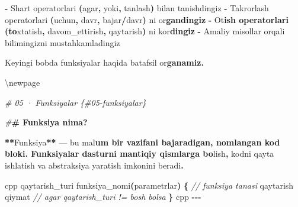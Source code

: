 \documentclass[a4paper,11pt,twoside,openright]{book}
\newenvironment{Shaded}{\begin{snugshade}}{\end{snugshade}}
\newcommand{\CharTok}[1]{\textcolor[rgb]{0.31,0.60,0.02}{#1}}
\newcommand{\CommentTok}[1]{\textcolor[rgb]{0.56,0.35,0.01}{\textit{#1}}}
\newcommand{\ErrorTok}[1]{\textcolor[rgb]{0.64,0.00,0.00}{\textbf{#1}}}
\newcommand{\NormalTok}[1]{#1}
\newcommand{\OperatorTok}[1]{\textcolor[rgb]{0.81,0.36,0.00}{\textbf{#1}}}
\newcommand{\PreprocessorTok}[1]{\textcolor[rgb]{0.56,0.35,0.01}{\textit{#1}}}
\begin{document}
\begin{Shaded}
\begin{Highlighting}[]
\OperatorTok{{-}}\NormalTok{ Shart operatorlari }\OperatorTok{(}\ErrorTok{\textasciigrave{}}\NormalTok{agar}\ErrorTok{\textasciigrave{}}\OperatorTok{,} \ErrorTok{\textasciigrave{}}\NormalTok{yoki}\ErrorTok{\textasciigrave{}}\OperatorTok{,} \ErrorTok{\textasciigrave{}}\NormalTok{tanlash}\ErrorTok{\textasciigrave{}}\OperatorTok{)}\NormalTok{ bilan tanishdingiz}
\OperatorTok{{-}}\NormalTok{ Takrorlash operatorlari }\OperatorTok{(}\ErrorTok{\textasciigrave{}}\NormalTok{uchun}\ErrorTok{\textasciigrave{}}\OperatorTok{,} \ErrorTok{\textasciigrave{}}\NormalTok{davr}\ErrorTok{\textasciigrave{}}\OperatorTok{,} \ErrorTok{\textasciigrave{}}\NormalTok{bajar}\OperatorTok{/}\NormalTok{davr}\ErrorTok{\textasciigrave{}}\OperatorTok{)}\NormalTok{ ni o}\CharTok{\textquotesingle{}r}\ErrorTok{gandingiz}
\OperatorTok{{-}}\NormalTok{ O}\CharTok{\textquotesingle{}t}\ErrorTok{ish operatorlari (\textasciigrave{}to}\CharTok{\textquotesingle{}}\NormalTok{xtatish}\ErrorTok{\textasciigrave{}}\OperatorTok{,} \ErrorTok{\textasciigrave{}}\NormalTok{davom\_ettirish}\ErrorTok{\textasciigrave{}}\OperatorTok{,} \ErrorTok{\textasciigrave{}}\NormalTok{qaytarish}\ErrorTok{\textasciigrave{}}\OperatorTok{)}\NormalTok{ ni ko}\CharTok{\textquotesingle{}r}\ErrorTok{dingiz}
\OperatorTok{{-}}\NormalTok{ Amaliy misollar orqali bilimingizni mustahkamladingiz}

\NormalTok{Keyingi bobda funksiyalar haqida batafsil o}\CharTok{\textquotesingle{}r}\ErrorTok{ganamiz.}


\NormalTok{\textbackslash{}newpage}

\PreprocessorTok{\# 05 · Funksiyalar \{\#05{-}funksiyalar\}}

\PreprocessorTok{\#}\ErrorTok{\# Funksiya nima?}

\OperatorTok{**}\NormalTok{Funksiya}\OperatorTok{**}\NormalTok{ — bu ma}\CharTok{\textquotesingle{}l}\ErrorTok{um bir vazifani bajaradigan, nomlangan kod bloki. Funksiyalar dasturni mantiqiy qismlarga bo}\CharTok{\textquotesingle{}}\NormalTok{lish}\OperatorTok{,}\NormalTok{ kodni qayta ishlatish va abstraksiya yaratish imkonini beradi}\OperatorTok{.}

\ErrorTok{\textasciigrave{}\textasciigrave{}\textasciigrave{}}\NormalTok{cpp}
\NormalTok{qaytarish\_turi funksiya\_nomi}\OperatorTok{(}\NormalTok{parametrlar}\OperatorTok{)} \OperatorTok{\{}
    \CommentTok{// funksiya tanasi}
\NormalTok{    qaytarish qiymat   }\CommentTok{// agar qaytarish\_turi != bosh bo\textquotesingle{}lsa}
\OperatorTok{\}}
\ErrorTok{\textasciigrave{}\textasciigrave{}\textasciigrave{}}\NormalTok{cpp}
\OperatorTok{{-}{-}{-}}


\end{Highlighting}
\end{Shaded}
\end{document}
